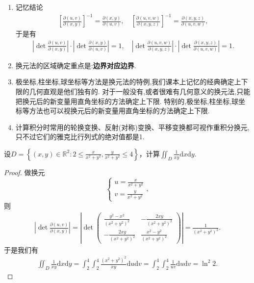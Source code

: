 \documentclass[../../main.tex]{subfiles}%
\begin{document}
\begin{remark}
\begin{enumerate}[(1)]
\item 记忆结论
\begin{align*}
\left[\frac{\partial(u,v)}{\partial(x,y)}\right]^{-1} = \frac{\partial(x,y)}{\partial(u,v)}, \quad \left[\frac{\partial(u,v,w)}{\partial(x,y,z)}\right]^{-1} = \frac{\partial(x,y,z)}{\partial(u,v,w)},
\end{align*}
于是有
\begin{align*}
\left|\det \frac{\partial(u,v)}{\partial(x,y)}\right| \cdot \left|\det \frac{\partial(x,y)}{\partial(u,v)}\right| = 1,\quad  \left|\det \frac{\partial(u,v,w)}{\partial(x,y,z)}\right| \cdot \left|\det \frac{\partial(x,y,z)}{\partial(u,v,w)}\right| = 1.
\end{align*}

\item 换元法的区域确定重点是:\textbf{边界对应边界}.

\item 极坐标,柱坐标,球坐标等方法是换元法的特例,我们课本上记忆的经典确定上下限的几何直观是他们独有的. 对于一般没有,或者很难有几何意义的换元法,只能把换元后的新变量用直角坐标的方法确定上下限. 特别的,极坐标,柱坐标,球坐标等方法也可以视换元后的新变量用直角坐标的方法确定上下限.

\item 计算积分时常用的轮换变换、反射(对称)变换、平移变换都可视作重积分换元,只不过它们的雅克比行列式的绝对值都是1.
\end{enumerate}
\end{remark}

\begin{example}
设$D=\left\{(x,y)\in\mathbb{R}^2:2\leqslant \frac{x}{x^2+y^2},\frac{y}{x^2+y^2}\leqslant4\right\}$，计算$\iint_{D}\frac{1}{xy}\mathrm{d}x\mathrm{d}y$.
\end{example}

\begin{proof}

做换元
\[
\begin{cases}
u=\displaystyle\frac{x}{x^2+y^2}\\[4pt]
v=\displaystyle\frac{y}{x^2+y^2}
\end{cases},
\]
则
\begin{align*}
\left|\det \frac{\partial(u,v)}{\partial(x,y)}\right|
=\left|\det \begin{pmatrix}
\displaystyle\frac{y^2-x^2}{(x^2+y^2)^2} & \displaystyle-\frac{2xy}{(x^2+y^2)^2}\\[6pt]
\displaystyle-\frac{2xy}{(x^2+y^2)^2} & \displaystyle\frac{x^2-y^2}{(x^2+y^2)^2}
\end{pmatrix}\right|
=\frac{1}{(x^2+y^2)^2}.
\end{align*}
于是我们有
\begin{align*}
\iint_{D}\frac{1}{xy}\mathrm{d}x\mathrm{d}y
=\int_{2}^{4}\int_{2}^{4}\frac{(x^2+y^2)^2}{xy}\mathrm{d}u\mathrm{d}v
=\int_{2}^{4}\int_{2}^{4}\frac{1}{uv}\mathrm{d}u\mathrm{d}v=\ln^2 2.
\end{align*}
\end{proof}
\end{document}
